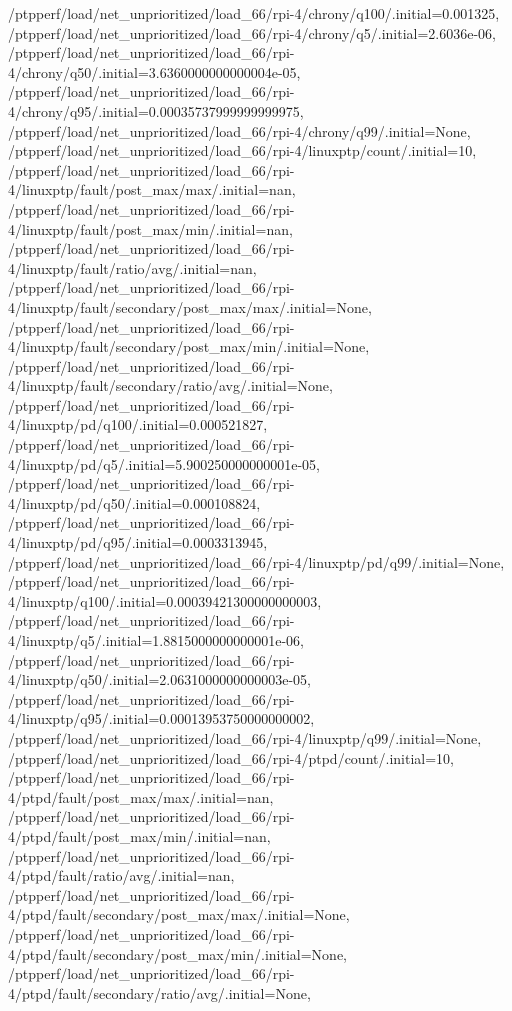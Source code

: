 {    /ptpperf/load/net_unprioritized/load_66/rpi-4/chrony/q100/.initial=0.001325,
    /ptpperf/load/net_unprioritized/load_66/rpi-4/chrony/q5/.initial=2.6036e-06,
    /ptpperf/load/net_unprioritized/load_66/rpi-4/chrony/q50/.initial=3.6360000000000004e-05,
    /ptpperf/load/net_unprioritized/load_66/rpi-4/chrony/q95/.initial=0.00035737999999999975,
    /ptpperf/load/net_unprioritized/load_66/rpi-4/chrony/q99/.initial=None,
    /ptpperf/load/net_unprioritized/load_66/rpi-4/linuxptp/count/.initial=10,
    /ptpperf/load/net_unprioritized/load_66/rpi-4/linuxptp/fault/post_max/max/.initial=nan,
    /ptpperf/load/net_unprioritized/load_66/rpi-4/linuxptp/fault/post_max/min/.initial=nan,
    /ptpperf/load/net_unprioritized/load_66/rpi-4/linuxptp/fault/ratio/avg/.initial=nan,
    /ptpperf/load/net_unprioritized/load_66/rpi-4/linuxptp/fault/secondary/post_max/max/.initial=None,
    /ptpperf/load/net_unprioritized/load_66/rpi-4/linuxptp/fault/secondary/post_max/min/.initial=None,
    /ptpperf/load/net_unprioritized/load_66/rpi-4/linuxptp/fault/secondary/ratio/avg/.initial=None,
    /ptpperf/load/net_unprioritized/load_66/rpi-4/linuxptp/pd/q100/.initial=0.000521827,
    /ptpperf/load/net_unprioritized/load_66/rpi-4/linuxptp/pd/q5/.initial=5.900250000000001e-05,
    /ptpperf/load/net_unprioritized/load_66/rpi-4/linuxptp/pd/q50/.initial=0.000108824,
    /ptpperf/load/net_unprioritized/load_66/rpi-4/linuxptp/pd/q95/.initial=0.0003313945,
    /ptpperf/load/net_unprioritized/load_66/rpi-4/linuxptp/pd/q99/.initial=None,
    /ptpperf/load/net_unprioritized/load_66/rpi-4/linuxptp/q100/.initial=0.00039421300000000003,
    /ptpperf/load/net_unprioritized/load_66/rpi-4/linuxptp/q5/.initial=1.8815000000000001e-06,
    /ptpperf/load/net_unprioritized/load_66/rpi-4/linuxptp/q50/.initial=2.0631000000000003e-05,
    /ptpperf/load/net_unprioritized/load_66/rpi-4/linuxptp/q95/.initial=0.00013953750000000002,
    /ptpperf/load/net_unprioritized/load_66/rpi-4/linuxptp/q99/.initial=None,
    /ptpperf/load/net_unprioritized/load_66/rpi-4/ptpd/count/.initial=10,
    /ptpperf/load/net_unprioritized/load_66/rpi-4/ptpd/fault/post_max/max/.initial=nan,
    /ptpperf/load/net_unprioritized/load_66/rpi-4/ptpd/fault/post_max/min/.initial=nan,
    /ptpperf/load/net_unprioritized/load_66/rpi-4/ptpd/fault/ratio/avg/.initial=nan,
    /ptpperf/load/net_unprioritized/load_66/rpi-4/ptpd/fault/secondary/post_max/max/.initial=None,
    /ptpperf/load/net_unprioritized/load_66/rpi-4/ptpd/fault/secondary/post_max/min/.initial=None,
    /ptpperf/load/net_unprioritized/load_66/rpi-4/ptpd/fault/secondary/ratio/avg/.initial=None,
}
